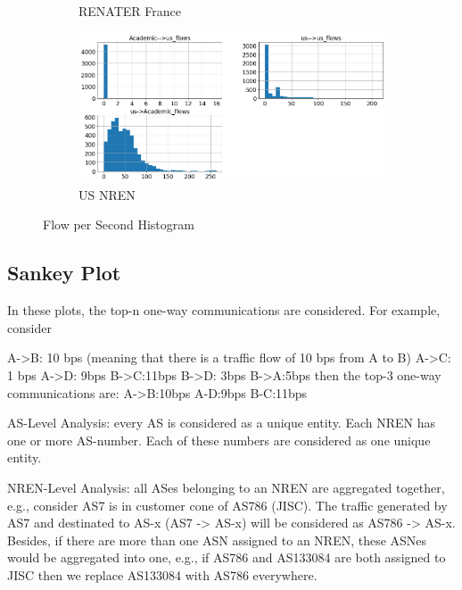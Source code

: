 \documentclass[10pt, journal, letterpaper]{IEEEtran}
\newcommand\histFigSze{0.48}
\begin{document}
\begin{figure}
\begin{subfigure}{\histFigSze\textwidth}
          \caption{RENATER France}
          \label{fig:renater_hist_fps}
    \end{subfigure}
    \begin{subfigure}{\histFigSze\textwidth}
          \centering
          \includegraphics[width=\columnwidth]{img/us_hist_fps.png}
          \caption{US NREN}
          \label{fig:US_hist_fps}
    \end{subfigure}
    \caption{Flow per Second Histogram}
    \label{fig:nrens_hist_fps}
\end{figure}

\subsection{Sankey Plot}
In these plots, the top-n one-way communications are considered. For example, consider

A->B: 10 bps (meaning that there is a traffic flow of 10 bps from A to B)
A->C: 1 bps
A->D: 9bps
B->C:11bps
B->D: 3bps
B->A:5bps
then the top-3 one-way communications are:
A->B:10bps
A-D:9bps
B-C:11bps

AS-Level Analysis: every AS is considered as a unique entity. Each NREN has one or more AS-number. Each of these numbers are considered as one unique entity.

NREN-Level Analysis: all ASes belonging to an NREN are aggregated together, e.g., consider AS7 is in customer cone of AS786 (JISC). The traffic generated by AS7 and destinated to AS-x (AS7 -> AS-x) will be considered as AS786 -> AS-x. Besides, if there are more than one ASN assigned to an NREN, these ASNes would be aggregated into one, e.g., if AS786 and AS133084 are both assigned to JISC then we replace AS133084 with AS786 everywhere.
\end{document}
